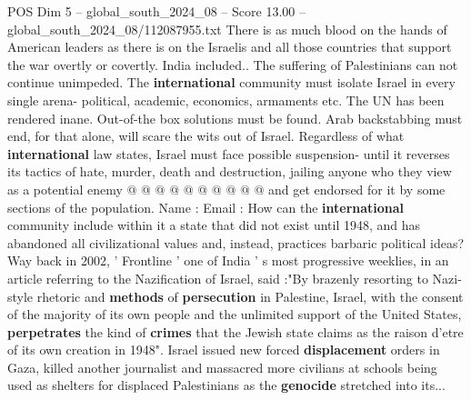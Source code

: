 \begin{textsample}{POS Dim 5 – global\_south\_2024\_08 – Score 13.00 – global\_south\_2024\_08/112087955.txt}
There is as much blood on the hands of American leaders as there is on the Israelis and all those countries that support the war overtly or covertly.
India included..
The suffering of Palestinians can not continue unimpeded.
The \textbf{international} community must isolate Israel in every single arena- political, academic, economics, armaments etc.
The UN has been rendered inane.
Out-of-the box solutions must be found.
Arab backstabbing must end, for that alone, will scare the wits out of Israel.
Regardless of what \textbf{international} law states, Israel must face possible suspension- until it reverses its tactics of hate, murder, death and destruction, jailing anyone who they view as a potential enemy @ @ @ @ @ @ @ @ @ @ and get endorsed for it by some sections of the population.
Name : Email : How can the \textbf{international} community include within it a state that did not exist until 1948, and has abandoned all civilizational values and, instead, practices barbaric political ideas?
Way back in 2002, ' Frontline ' one of India ' s most progressive weeklies, in an article referring to the Nazification of Israel, said :"By brazenly resorting to Nazi-style rhetoric and \textbf{methods} of \textbf{persecution} in Palestine, Israel, with the consent of the majority of its own people and the unlimited support of the United States, \textbf{perpetrates} the kind of \textbf{crimes} that the Jewish state claims as the raison d'etre of its own creation in 1948".
Israel issued new forced \textbf{displacement} orders in Gaza, killed another journalist and massacred more civilians at schools being used as shelters for displaced Palestinians as the \textbf{genocide} stretched into its...

\end{textsample}
